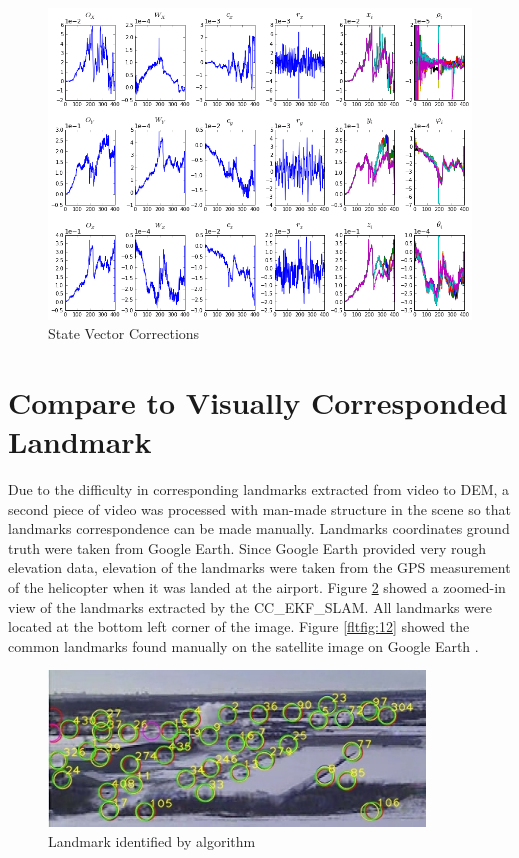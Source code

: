 \begin{figure}[h]
\centering
\includegraphics[width=15cm, keepaspectratio=true]
{./Figures/fltfig/cut1/Figure112.png}
\caption{State Vector Corrections}
\label{fltfig:4}
\end{figure}

\FloatBarrier

\section{Compare to Visually Corresponded Landmark}
\label{sec:flight-manual}
Due to the difficulty in corresponding landmarks extracted from video
to DEM, a second piece of video was processed with man-made structure
in the scene so that landmarks correspondence can be made manually.
Landmarks coordinates ground truth were taken from Google Earth. Since
Google Earth provided very rough elevation data, elevation of the
landmarks were taken from the GPS measurement of the helicopter when
it was landed at the airport. Figure \ref{fltfig:11} showed a
zoomed-in view of the landmarks extracted by the CC\_EKF\_SLAM. All
landmarks were located at the bottom left corner of the image. Figure
\ref{fltfig:12} showed the common landmarks found manually on the
satellite image on Google Earth \cite{_google_????}.

\begin{figure}[h]
\centering
\includegraphics[width=10cm, keepaspectratio=true]
{./Figures/fltfig/airport/frame398_landmarks.jpg}
\caption{Landmark identified by algorithm }
\label{fltfig:11}
\end{figure}

